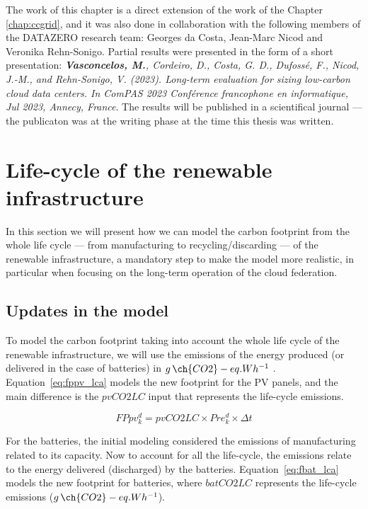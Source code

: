 The work of this chapter is a direct extension of the work of the Chapter \ref{chap:ccgrid}, and it was also done in collaboration with the following members of the DATAZERO\cite{datazero} research team: Georges da Costa, Jean-Marc Nicod and Veronika Rehn-Sonigo. Partial results were presented in the form of a short presentation:   \textit{\textbf{Vasconcelos, M.}, Cordeiro, D., Costa, G. D., Dufossé, F., Nicod, J.-M., and Rehn-Sonigo, V. (2023). Long-term evaluation for sizing low-carbon cloud data centers. In ComPAS 2023 Conférence francophone en informatique, Jul 2023, Annecy, France}. The results will be published in a scientifical journal --- the publicaton was at the writing phase at the time this thesis was written. 




\section{Life-cycle of the renewable infrastructure}
\label{sec:lifecicle}

In this section we will present how we can model the carbon footprint from the whole life cycle --- from manufacturing to recycling/discarding --- of the renewable infrastructure,  a mandatory step to make the model more realistic, in particular when focusing on the long-term operation of the cloud federation.



\subsection{Updates in the model}

To model the carbon footprint taking into account the whole life cycle of the renewable infrastructure,  we will use the emissions of the energy produced (or
delivered in the case of batteries) in $g\,\ch{CO2}-eq.Wh^{-1}$ . Equation~\eqref{eq:fppv_lca} models the new footprint for the PV panels, and the main difference is the $pvCO2LC$ input that represents the life-cycle emissions.

\begin{equation} \label{eq:fppv_lca}
   FPpv^d_k =  pvCO2LC \times Pre_k^d \times \Delta t
\end{equation}


For the batteries, the initial modeling considered the emissions of manufacturing related to its capacity. Now to account for all the life-cycle, the emissions relate to the energy delivered (discharged) by the batteries. Equation~\eqref{eq:fbat_lca} models the new footprint for batteries, where $batCO2LC$ represents the life-cycle emissions  ($g\,\ch{CO2}-eq.Wh^{-1}$).

